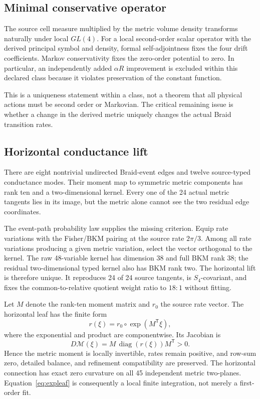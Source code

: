 \documentclass[11pt]{article}
\theoremstyle{definition}
\theoremstyle{remark}
\begin{document}
\subsection{Minimal conservative operator}

The source cell measure multiplied by the metric volume density transforms naturally under local $GL(4)$. For a local second-order scalar operator with the derived principal symbol and density, formal self-adjointness fixes the four drift coefficients. Markov conservativity fixes the zero-order potential to zero. In particular, an independently added $\alpha R$ improvement is excluded within this declared class because it violates preservation of the constant function.

This is a uniqueness statement within a class, not a theorem that all physical actions must be second order or Markovian. The critical remaining issue is whether a change in the derived metric uniquely changes the actual Braid transition rates.

\subsection{Horizontal conductance lift}

There are eight nontrivial undirected Braid-event edges and twelve source-typed conductance modes. Their moment map to symmetric metric components has rank ten and a two-dimensional kernel. Every one of the 24 actual metric tangents lies in its image, but the metric alone cannot see the two residual edge coordinates.

The event-path probability law supplies the missing criterion. Equip rate variations with the Fisher/BKM pairing at the source rate $2\pi/3$. Among all rate variations producing a given metric variation, select the vector orthogonal to the kernel. The raw 48-variable kernel has dimension 38 and full BKM rank 38; the residual two-dimensional typed kernel also has BKM rank two. The horizontal lift is therefore unique. It reproduces 24 of 24 source tangents, is $S_4$-covariant, and fixes the common-to-relative quotient weight ratio to $18:1$ without fitting.

Let $M$ denote the rank-ten moment matrix and $r_0$ the source rate vector. The horizontal leaf has the finite form
\begin{equation}\label{eq:expleaf}
 r(\xi)=r_0\circ\exp(M^{\mathsf T}\xi),
\end{equation}
where the exponential and product are componentwise. Its Jacobian is
\begin{equation}
 D\mathcal M(\xi)=M\,\operatorname{diag}(r(\xi))M^{\mathsf T}>0.
\end{equation}
Hence the metric moment is locally invertible, rates remain positive, and row-sum zero, detailed balance, and refinement compatibility are preserved. The horizontal connection has exact zero curvature on all 45 independent metric two-planes. Equation~\eqref{eq:expleaf} is consequently a local finite integration, not merely a first-order fit.
\end{document}
